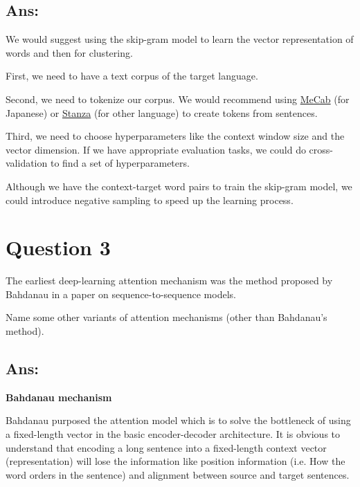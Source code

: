 \documentclass{kthreport}
\begin{document}
\subsection{Ans:}


We would suggest using the skip-gram model \cite{mikolov2013distributed}
to learn the vector representation of words and then for clustering.

First, we need to have a text corpus of the target language.

Second, we need to tokenize our corpus. We would recommend using
\href{https://taku910.github.io/mecab/}{MeCab} (for Japanese)
or \href{https://stanfordnlp.github.io/stanza/}{Stanza} (for other language)
to create tokens from sentences.

Third, we need to choose hyperparameters like the context window size and the vector dimension.
If we have appropriate evaluation tasks, we could do cross-validation to find
a set of hyperparameters.

Although we have the context-target word pairs to train the skip-gram model, we
could introduce negative sampling to speed up the learning process. \cite{mikolov2013distributed}

\section{Question 3}
The earliest deep-learning attention mechanism was the method proposed by Bahdanau
in a paper on sequence-to-sequence models.

Name some other variants of attention mechanisms (other than Bahdanau's method).

\subsection*{Ans:}

\textbf{Bahdanau mechanism}


Bahdanau purposed the attention model which is to solve the bottleneck of using
a fixed-length vector in the basic encoder-decoder architecture. It is obvious to understand
that encoding a long sentence into a fixed-length context vector (representation)
will lose the information like position information (i.e. How the word orders in the sentence)
and alignment between source and target sentences.
\end{document}
